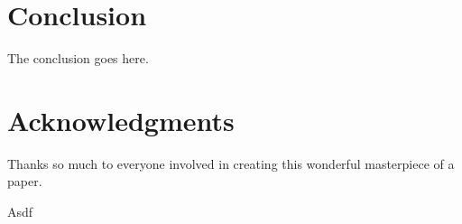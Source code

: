 \documentclass[lettersize,journal]{IEEEtran}
\begin{document}
\section{Conclusion}

The conclusion goes here.

\section*{Acknowledgments}

Thanks so much to everyone involved in creating this wonderful masterpiece of a paper.

\begin{thebibliography}{1}


Asdf


\end{thebibliography}


\vfill
\end{document}
